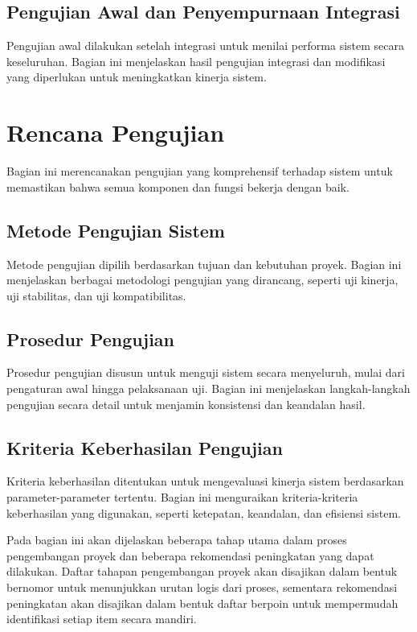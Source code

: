 \subsection{Pengujian Awal dan Penyempurnaan Integrasi}
Pengujian awal dilakukan setelah integrasi untuk menilai performa sistem secara keseluruhan. Bagian ini menjelaskan hasil pengujian integrasi dan modifikasi yang diperlukan untuk meningkatkan kinerja sistem.

\section{Rencana Pengujian}
Bagian ini merencanakan pengujian yang komprehensif terhadap sistem untuk memastikan bahwa semua komponen dan fungsi bekerja dengan baik.

\subsection{Metode Pengujian Sistem}
Metode pengujian dipilih berdasarkan tujuan dan kebutuhan proyek. Bagian ini menjelaskan berbagai metodologi pengujian yang dirancang, seperti uji kinerja, uji stabilitas, dan uji kompatibilitas.

\subsection{Prosedur Pengujian}
Prosedur pengujian disusun untuk menguji sistem secara menyeluruh, mulai dari pengaturan awal hingga pelaksanaan uji. Bagian ini menjelaskan langkah-langkah pengujian secara detail untuk menjamin konsistensi dan keandalan hasil.

\subsection{Kriteria Keberhasilan Pengujian}
Kriteria keberhasilan ditentukan untuk mengevaluasi kinerja sistem berdasarkan parameter-parameter tertentu. Bagian ini menguraikan kriteria-kriteria keberhasilan yang digunakan, seperti ketepatan, keandalan, dan efisiensi sistem.

Pada bagian ini akan dijelaskan beberapa tahap utama dalam proses pengembangan proyek dan beberapa rekomendasi peningkatan yang dapat dilakukan. Daftar tahapan pengembangan proyek akan disajikan dalam bentuk bernomor untuk menunjukkan urutan logis dari proses, sementara rekomendasi peningkatan akan disajikan dalam bentuk daftar berpoin untuk mempermudah identifikasi setiap item secara mandiri.

